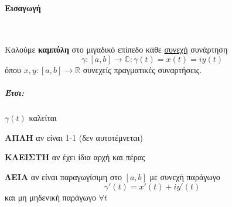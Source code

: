 \documentclass[12pt,a4paper,notitlepage,fleqn]{article}
\begin{document}
	\paragraph{Εισαγωγή} \hspace{0pt}\\

	\begin{defn*}{}
        Καλούμε \textbf{καμπύλη} στο μιγαδικό επίπεδο κάθε \underline{συνεχή} συνάρτηση
        \[
        \gamma:[a,b]\to\mathbb C :\gamma(t)=x(t)=iy(t)
        \]
        όπου \( x,y:[a,b]\to\mathbb R  \) συνεχείς πραγματικές συναρτήσεις.
	\end{defn*}

	\subparagraph{Έτσι:} \( \gamma(t) \) καλείται
	\begin{invitemize}
		\item \textbf{ΑΠΛΗ} αν είναι 1-1 (δεν αυτοτέμνεται)
		\item \textbf{ΚΛΕΙΣΤΗ} αν έχει ίδια αρχή και πέρας
		\item \textbf{ΛΕΙΑ} αν είναι παραγωγίσιμη στο \( [a,b] \) με συνεχή παράγωγο
		\[
		\gamma'(t)=x'(t)+iy'(t)
		\]
		και μη μηδενική παράγωγο \( \forall t \)
	\end{invitemize}
\end{document}
